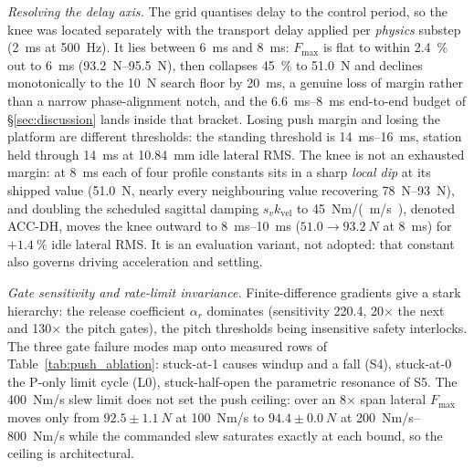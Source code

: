 \documentclass{jcd}
\begin{document}
\emph{Resolving the delay axis.} The grid quantises delay to the control period,
so the knee was located separately with the transport delay applied per
\emph{physics} substep (\SI{2}{ms} at \SI{500}{Hz}). It lies between \SI{6}{ms}
and \SI{8}{ms}: $F_{\max}$ is flat to within \SI{2.4}{\percent} out to \SI{6}{ms}
(\SIrange{93.2}{95.5}{N}), then collapses \SI{45}{\percent} to \SI{51.0}{N} and
declines monotonically to the \SI{10}{N} search floor by \SI{20}{ms}, a genuine loss of margin rather than a narrow phase-alignment notch, and the
\SIrange{6.6}{8}{ms} end-to-end budget of \S\ref{sec:discussion} lands inside
that bracket. Losing push margin and losing the platform are different
thresholds: the standing threshold is \SIrange{14}{16}{ms}, station held through
\SI{14}{ms} at \SI{10.84}{mm} idle lateral RMS. The knee is not an exhausted
margin: at \SI{8}{ms} each of four profile constants sits in a sharp \emph{local
dip} at its shipped value (\SI{51.0}{N}, nearly every neighbouring value
recovering \SIrange{78}{93}{N}), and doubling the scheduled sagittal damping $s_v k_{\text{vel}}$ to \SI{45}{Nm/(m/s)}, denoted ACC-DH, moves the knee outward to \SIrange{8}{10}{ms}
($51.0\rightarrow\SI{93.2}{N}$ at \SI{8}{ms}) for $+\SI{1.4}{\percent}$ idle
lateral RMS. It is an evaluation variant, not adopted: that constant also governs
driving acceleration and settling.

\emph{Gate sensitivity and rate-limit invariance.} Finite-difference gradients
give a stark hierarchy: the release coefficient $\alpha_r$ dominates
(sensitivity \num{220.4}, \num{20}$\times$ the next and \num{130}$\times$ the
pitch gates), the pitch thresholds being insensitive safety interlocks. The
three gate failure modes map onto measured rows of
Table~\ref{tab:push_ablation}: stuck-at-1 causes windup and a fall (S4),
stuck-at-0 the P-only limit cycle (L0), stuck-half-open the parametric resonance
of S5. The \SI{400}{Nm/s} slew limit does not set the push ceiling: over an
\num{8}$\times$ span lateral $F_{\max}$ moves only from $92.5{\pm}\SI{1.1}{N}$ at
\SI{100}{Nm/s} to $94.4{\pm}\SI{0.0}{N}$ at \SIrange{200}{800}{Nm/s} while the
commanded slew saturates exactly at each bound, so the ceiling is architectural.
\end{document}
